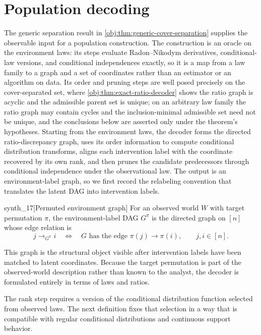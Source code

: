 \section{Population decoding}\label{sec:population-decoding}

The generic separation result in \cref{obj:thm:generic-cover-separation} supplies the observable input for a population construction. The construction is an oracle on the environment laws: its steps evaluate Radon--Nikodym derivatives, conditional-law versions, and conditional independences exactly, so it is a map from a law family to a graph and a set of coordinates rather than an estimator or an algorithm on data. Its order and pruning steps are well posed precisely on the cover-separated set, where \cref{obj:thm:exact-ratio-decoder} shows the ratio graph is acyclic and the admissible parent set is unique; on an arbitrary law family the ratio graph may contain cycles and the inclusion-minimal admissible set need not be unique, and the conclusions below are asserted only under the theorem's hypotheses. Starting from the environment laws, the decoder forms the directed ratio-discrepancy graph, uses its order information to compute conditional distribution transforms, aligns each intervention label with the coordinate recovered by its own rank, and then prunes the candidate predecessors through conditional independence under the observational law. The output is an environment-label graph, so we first record the relabeling convention that translates the latent DAG into intervention labels.

\begin{definitionv}{synth_17}[Permuted environment graph]
For an observed world \(W\) with target permutation \(\pi\), the environment-label DAG \(G^\pi\) is the directed graph on \([n]\) whose edge relation is
\[
j\to_{G^\pi} i
\quad\Longleftrightarrow\quad
G\text{ has the edge }\pi(j)\to \pi(i),
\qquad j,i\in[n].
\]
\end{definitionv}

This graph is the structural object visible after intervention labels have been matched to latent coordinates. Because the target permutation is part of the observed-world description rather than known to the analyst, the decoder is formulated entirely in terms of laws and ratios.

The rank step requires a version of the conditional distribution function selected from observed laws. The next definition fixes that selection in a way that is compatible with regular conditional distributions and continuous support behavior.

